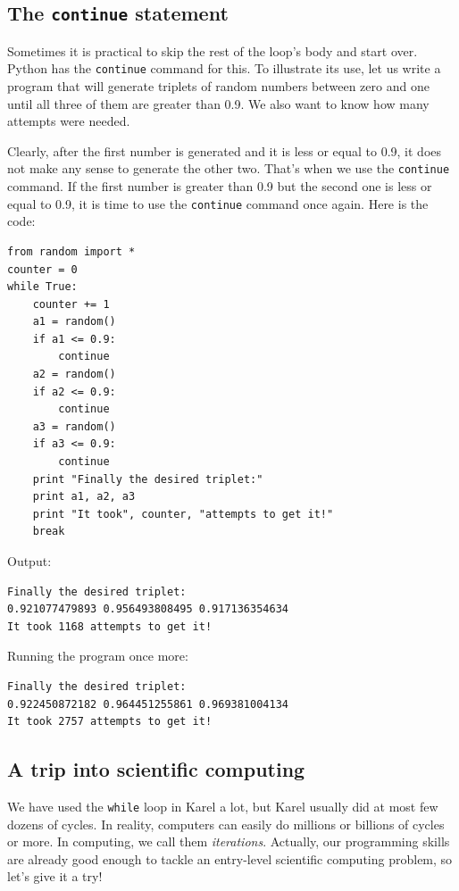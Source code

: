 \subsection{The {\tt continue} statement}

Sometimes it is practical to skip the rest of the loop's body and start over. Python 
has the {\tt continue} command for this. To illustrate its use, let us write 
a program that will generate triplets of random numbers between zero and one
until all three of them are greater than 0.9. We also want to know how many 
attempts were needed. 

Clearly, after the first number is generated and it is less or equal to 0.9,
it does not make any sense to generate the other two. That's when 
we use the {\tt continue} command. If the first number is greater than 0.9 
but the second one is less or equal to 0.9, it is time to use the {\tt continue} 
command once again. Here is the code:

\begin{verbatim}
from random import *
counter = 0
while True:
    counter += 1
    a1 = random()
    if a1 <= 0.9:
        continue
    a2 = random()
    if a2 <= 0.9:
        continue
    a3 = random()
    if a3 <= 0.9:
        continue
    print "Finally the desired triplet:" 
    print a1, a2, a3
    print "It took", counter, "attempts to get it!"
    break
\end{verbatim}
Output:

\begin{verbatim}
Finally the desired triplet:
0.921077479893 0.956493808495 0.917136354634
It took 1168 attempts to get it!
\end{verbatim}
Running the program once more:

\begin{verbatim}
Finally the desired triplet:
0.922450872182 0.964451255861 0.969381004134
It took 2757 attempts to get it!
\end{verbatim}

\subsection{A trip into scientific computing}

We have used the {\tt while} loop in Karel a lot,
but Karel usually did at most few dozens of cycles. In reality, computers can easily 
do millions or billions of cycles or more. In computing, we call them {\em iterations}.
Actually, our programming skills are already good enough to tackle an entry-level
scientific computing problem, so let's give it a try! 

